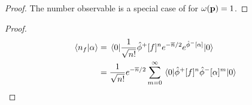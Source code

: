 \qkgcoherentnumber
\begin{proof}
	The number observable is a special case of  for $\omega(\vb{p})=1$.
\end{proof}

\qkgcoherentnumberinnerproduct
\begin{proof}
	\begin{equation*}
		\begin{split}
			\braket{n_f}{\alpha}
			&=
			\expval{
				\frac{1}{\sqrt{n!}}
				\hat\phi^+[f]^n
				e^{-\overline{n}/2}
				e^{\hat\phi^-[\alpha]}
			}{0}
			\\
			&=
			\frac{1}{\sqrt{n!}}
			e^{-\overline{n}/2}
			\sum_{m=0}^\infty
			\expval{
				\hat\phi^+[f]^n
				\hat\phi^-[\alpha]^m
			}{0}
		\end{split}
	\end{equation*}
\end{proof}
\qkgcoherentinnerproduct
